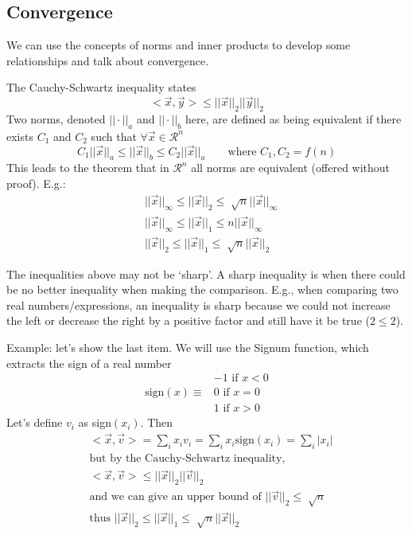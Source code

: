 \documentclass[12pt]{article}
\begin{document}
\subsection{Convergence}
We can use the concepts of norms and inner products to develop some relationships and talk about convergence. 

The Cauchy-Schwartz inequality states
%
\begin{equation}
< \vec{x}, \vec{y} > \leq ||\vec{x}||_2 ||\vec{y}||_2 \nonumber
\end{equation}
%
Two norms, denoted $|| \cdot ||_a$ and $|| \cdot ||_b$ here, are defined as being equivalent if there exists $C_1$ and $C_2$ such that $\forall \vec{x} \in \mathcal{R}^n$
%
\begin{equation}
C_1 ||\vec{x}||_a \leq ||\vec{x}||_b \leq C_2 ||\vec{x}||_a \qquad \text{where } C_1, C_2 = f(n) \nonumber
\end{equation}
%
This leads to the theorem that in $\mathcal{R}^n$ all norms are equivalent (offered without proof). E.g.:
\begin{align}
& ||\vec{x}||_{\infty} \leq ||\vec{x}||_2 \leq \sqrt[]{n} ||\vec{x}||_{\infty} \nonumber \\
%
& ||\vec{x}||_{\infty} \leq ||\vec{x}||_1 \leq n ||\vec{x}||_{\infty} \nonumber \\
%
& ||\vec{x}||_2 \leq ||\vec{x}||_1 \leq \sqrt[]{n} ||\vec{x}||_2 \nonumber
\end{align}

The inequalities above may not be `sharp'. A sharp inequality is when there could be no better inequality when making the comparison. E.g., when comparing two real numbers/expressions, an inequality is sharp because we could not increase the left or decrease the right by a positive factor and still have it be true ($2 \leq 2$). 

Example: let's show the last item. We will use the Signum function, which extracts the sign of a real number
\begin{align}
              & -1 \text{ if } x < 0 \nonumber \\
\text{sign}(x) \equiv &  0 \text{ if } x = 0 \nonumber \\
              &  1 \text{ if } x > 0 \nonumber
\end{align}
%
Let's define $v_i$ as sign$(x_i)$. Then
%
\begin{align}
&< \vec{x}, \vec{v} > = \sum_i x_i v_i = \sum_i x_i \text{sign}(x_i) = \sum_i |x_i| \nonumber \\
%
&\text{but by the Cauchy-Schwartz inequality,}\nonumber \\
%
&< \vec{x}, \vec{v} > \leq ||\vec{x}||_2 ||\vec{v}||_2 \nonumber \\
%
&\text{and we can give an upper bound of } ||\vec{v}||_2 \leq \sqrt[]{n} \nonumber \\ 
%
&\text{thus } ||\vec{x}||_2 \leq ||\vec{x}||_1 \leq \sqrt[]{n} ||\vec{x}||_2 \nonumber
\end{align}
\end{document}
